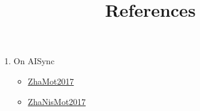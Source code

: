 \documentclass[12pt,a4paper,final]{article}
\title{References}
\begin{document}
\begin{enumerate}
    \item On AISync
    \begin{itemize}
        \item 
        \href{http://iopscience.iop.org/article/10.1088/1361-6544/aa8fe7/meta}{ZhaMot2017}
        
        \item  
        \href{https://journals.aps.org/pre/abstract/10.1103/PhysRevE.95.062215}{ZhaNisMot2017}
    \end{itemize}
\end{enumerate}
\end{document}
